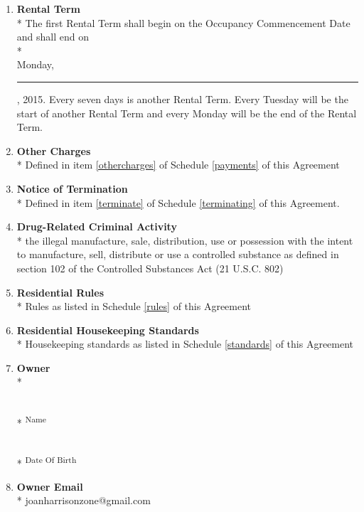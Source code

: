 \documentclass[12pt,letterpaper]{article}
\newcommand{\datefillin}{\hspace{0.2cm}\rule{3cm}{.1pt}}
\newcommand{\rules}{Residential Rules}
\newcommand{\standards}{Residential Housekeeping Standards}
\newcommand{\ownermail}{Owner Email}
\newcommand{\firstday}{Occupancy Commencement Date}
\newcommand{\rentweek}{Rental Term}
\begin{document}
\begin{multicols}{2}
\begin{enumerate}
		\item \textbf{\rentweek{}}\\* \label{rentweek}
			The first \rentweek{} shall begin on the \firstday{} and shall end on \\* \\
			Monday, \datefillin, 2015. Every seven days is another \rentweek{}. Every Tuesday will be the start of another \rentweek{} and every Monday will be the end of the \rentweek{}.
			
		\item \textbf{Other Charges}\\*
			Defined in item \ref{othercharges} of Schedule \ref{payments} of this Agreement
			
		\item \textbf{Notice of Termination}\\* \label{noticeoftermination}
			Defined in item \ref{terminate} of Schedule \ref{terminating} of this Agreement.

		\item \textbf{Drug-Related Criminal Activity}\\*
			the illegal manufacture, sale, distribution, use or possession with the intent to manufacture, sell, distribute or use a controlled substance as defined in section 102 of the Controlled Substances Act (21 U.S.C. 802) 

		\item \textbf{\rules{}}\\*
			Rules as listed in Schedule \ref{rules} of this Agreement

		\item \textbf{\standards{}}\\*
			Housekeeping standards as listed in Schedule \ref{standards} of this Agreement

		\item \textbf{Owner}\\* \label{owner}
			\begin{minipage}[t]{2in}

				\vspace{0.5cm}\makebox[2in]{\hrulefill} \\*
				\textsuperscript{Name}
				
				\vspace{0.5cm}\makebox[2in]{\hrulefill} \\*
				\textsuperscript{Date Of Birth}
			\end{minipage}%

		\item \textbf{\ownermail{}}\\* \label{ownermail}
			joanharrisonzone@gmail.com


\end{enumerate}
\end{multicols}
\end{document}
